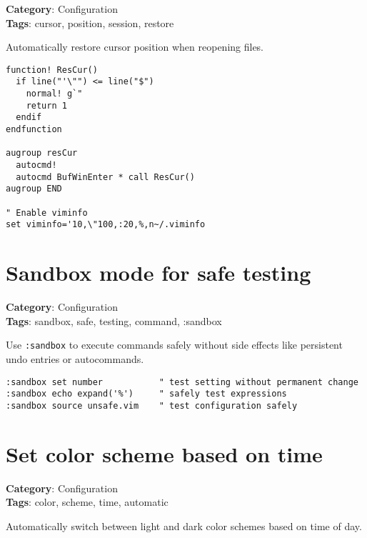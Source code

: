 {{{\textbf{Category}: Configuration\\ \textbf{Tags}: cursor, position, session, restore
\vspace{0.5cm}

Automatically restore cursor position when reopening files.

\begin{Exa*}{}
\begin{Verbatim}[fontsize=\footnotesize, breaklines, breakanywhere]
function! ResCur()
  if line("'\"") <= line("$")
    normal! g`"
    return 1
  endif
endfunction

augroup resCur
  autocmd!
  autocmd BufWinEnter * call ResCur()
augroup END

" Enable viminfo
set viminfo='10,\"100,:20,%,n~/.viminfo
\end{Verbatim}
\end{Exa*}

\section{Sandbox mode for safe testing}

\textbf{Category}: Configuration\\ \textbf{Tags}: sandbox, safe, testing, command, :sandbox
\vspace{0.5cm}

Use {\footnotesize \Verb§:sandbox§} to execute commands safely without side effects like persistent undo entries or autocommands.

\begin{Exa*}{}
\begin{Verbatim}[fontsize=\footnotesize, breaklines, breakanywhere]
:sandbox set number           " test setting without permanent change
:sandbox echo expand('%')     " safely test expressions
:sandbox source unsafe.vim    " test configuration safely
\end{Verbatim}
\end{Exa*}

\section{Set color scheme based on time}

\textbf{Category}: Configuration\\ \textbf{Tags}: color, scheme, time, automatic
\vspace{0.5cm}

Automatically switch between light and dark color schemes based on time of day.

}}}
